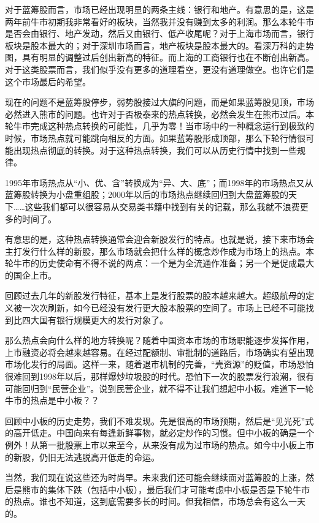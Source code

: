 对于蓝筹股而言，市场已经出现明显的两条主线：银行和地产。有意思的是，这是两年前牛市初期我非常看好的板块，当然我并没有赚到太多的利润。那么本轮牛市是否会由银行、地产发动，然后又由银行、低产收尾呢？对于上海市场而言，银行板块是股本最大的；对于深圳市场而言，地产板块是股本最大的。看深万科的走势图，具有明显的调整过后创出新高的特征。而上海的工商银行也在不断创出新高。对于这类股票而言，我们似乎没有更多的道理看空，更没有道理做空。也许它们是这个市场最后的希望。

现在的问题不是蓝筹股停步，弱势股接过大旗的问题，而是如果蓝筹股见顶，市场必然进入熊市的问题。也许对于否极泰来的热点转换，必然会发生在熊市过后。本轮牛市完成这种热点转换的可能性，几乎为零！当市场中的一种概念运行到极致的时候，市场热点就可能跳向相反的方面。如果蓝筹股形成顶部，那么下轮行情很可能出现热点彻底的转换。对于这种热点转换，我们可以从历史行情中找到一些规律。

1995年市场热点从“小、优、含”转换成为“异、大、底”；而1998年的市场热点又从蓝筹股转换为小盘重组股；2000年以后的市场热点继续回归到大盘蓝筹股的天下……这些我们都可以很容易从交易类书籍中找到有关的记载，那么我就不浪费更多的时间了。

有意思的是，这种热点转换通常会迎合新股发行的特点。也就是说，接下来市场会主打发行什么样的新股，那么市场就会把什么样的概念炒作成为市场上的热点。本轮牛市的历史使命有不得不说的两点：一个是为全流通作准备；另一个是促成最大的国企上市。

回顾过去几年的新股发行特征，基本上是发行股票的股本越来越大。超级航母的定义被一次次刷新，如今已经没有发行更大股本股票的空间了。市场上已经不可能找到比四大国有银行规模更大的发行对象了。

那么热点会向什么样的地方转换呢？随着中国资本市场的市场职能逐步发挥作用，上市融资必将会越来越容易。在经过配额制、审批制的道路后，市场确实有望出现市场化发行的局面。这样一来，随着退市机制的完善，“壳资源”的贬值，市场恐怕很难回到1998年以后，那样爆炒垃圾股的时代。恐怕下一次的股票发行浪潮，很有可能回归到“民营企业”。说到民营企业，就不得不让我们想起中小板。难道下一轮牛市的热点是中小板？？

回顾中小板的历史走势，我们不难发现。先是很高的市场预期，然后是“见光死”式的高开低走。中国向来有每逢新鲜事物，就必定炒作的习惯。但中小板的确是一个例外！从第一批股票上市以来至今，从来没有成为过市场的热点。如今中小板上市的新股，仍旧无法逃脱高开低走的命运。

当然，我们现在说这些还为时尚早。未来我们还可能会继续面对蓝筹股的上涨，然后是熊市的集体下跌（包括中小板），最后我们才可能考虑中小板是否是下轮牛市的热点。谁也不知道，这到底需要多长的时间。但我相信，市场总会有这么一天的。

